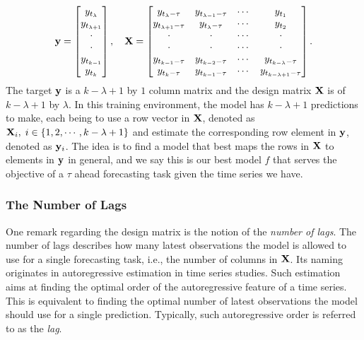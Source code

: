 \begin{equation*}
    \mathbf{y} = \begin{bmatrix}
        y_{t_\lambda}       \\
        y_{t_{\lambda + 1}} \\
        \cdot               \\
        \cdot               \\
        y_{t_{k-1}}         \\
        y_{t_k}             \\
    \end{bmatrix}
    , \quad
    \mathbf{X} = \begin{bmatrix}
        y_{t_{\lambda} - \tau}   & y_{t_{\lambda-1} - \tau} & \cdots & y_{t_{1}} \\
        y_{t_{\lambda+1} - \tau} & y_{t_{\lambda} - \tau}   & \cdots & y_{t_{2}} \\
        \cdot                    & \cdot                    & \cdots & \cdot     \\
        \cdot                    & \cdot                    & \cdots & \cdot     \\
        y_{t_{k-1} - \tau}       & y_{t_{k-2} - \tau}       & \cdots & y_{t_{k - \lambda} - \tau} \\
        y_{t_{k} - \tau}         & y_{t_{k-1} - \tau}       & \cdots & y_{t_{k - \lambda + 1} - \tau} \\
    \end{bmatrix}.
\end{equation*}
The target $\mathbf{y}$ is a $k-\lambda+1$ by $1$ column matrix and the design matrix $\mathbf{X}$ is of $k-\lambda+1$ by $\lambda$. In this training environment, the model has $k-\lambda + 1$ predictions to make, each being to use a row vector in $\mathbf{X}$, denoted as $\mathbf{X}_i, \; i \in \{1, 2, \cdots, k-\lambda+1 \}$ and estimate the corresponding row element in $\mathbf{y}$, denoted as $\mathbf{y}_i$. The idea is to find a model that best maps the rows in $\mathbf{X}$ to elements in $\mathbf{y}$ in general, and we say this is our best model $f$ that serves the objective of a $\tau$ ahead forecasting task given the time series we have.

\subsubsection{The Number of Lags}
One remark regarding the design matrix is the notion of the \textit{number of lags}. The number of lags describes how many latest observations the model is allowed to use for a single forecasting task, i.e., the number of columns in $\mathbf{X}$. Its naming originates in autoregressive estimation in time series studies. Such estimation aims at finding the optimal order of the autoregressive feature of a time series. This is equivalent to finding the optimal number of latest observations the model should use for a single prediction. Typically, such autoregressive order is referred to as the \textit{lag}.

